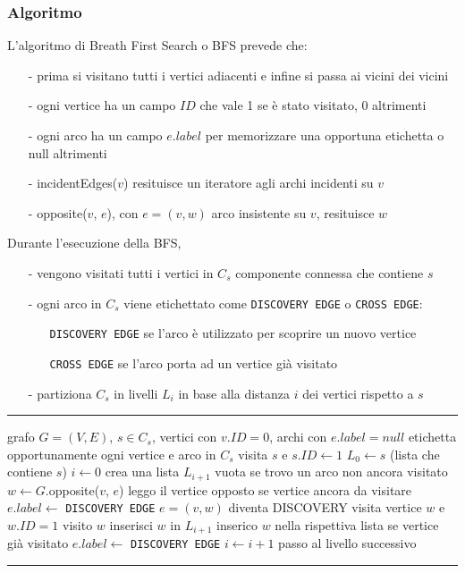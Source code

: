 \documentclass[a4paper]{article}
\makeatletter
\newenvironment{algo}[4]{
	\noindent\rule{\textwidth}{0.4pt}
	\begin{algorithmic}[1]
		\addtocounter{ALG@line}{-1}
		\Procedure{#1}{#2}
		\Require #3
		\Ensure #4
		\Statex }{
		\EndProcedure
	\end{algorithmic}
	\rule{\textwidth}{0.4pt}}
\makeatother
\begin{document}
\subsubsection*{Algoritmo}
L'algoritmo di Breath First Search o BFS prevede che:
\begin{itemize}[topsep=3pt, itemsep=0pt]
	\item[-] prima si visitano tutti i vertici adiacenti e infine si passa ai vicini dei vicini
	\item[-] ogni vertice ha un campo \(I\!D\) che vale 1 se è stato visitato, 0 altrimenti
	\item[-] ogni arco ha un campo \(e.label\) per memorizzare una opportuna etichetta o null altrimenti
	\item[-] incidentEdges(\(v\)) resituisce un iteratore agli archi incidenti su \(v\)
	\item[-] opposite(\(v\), \(e\)), con \(e = (v,w)\) arco insistente su \(v\), resituisce \(w\)
\end{itemize}
Durante l'esecuzione della BFS,
\begin{itemize}[topsep=3pt, itemsep=0pt]
	\item[-] vengono visitati tutti i vertici in \(C_s\) componente connessa che contiene \(s\)
	\item[-] ogni arco in \(C_s\) viene etichettato come \verb|DISCOVERY EDGE| o \verb|CROSS EDGE|:
	\begin{itemize}[topsep=0pt, itemsep=0pt]
		\item[] \verb|DISCOVERY EDGE| se l'arco è utilizzato per scoprire un nuovo vertice
		\item[] \verb|CROSS EDGE| se l'arco porta ad un vertice già visitato
	\end{itemize}
	\item[-] partiziona \(C_s\) in livelli \(L_i\) in base alla distanza \(i\) dei vertici rispetto a \(s\)
\end{itemize}

\begin{algo}{BFS}{$G$, $s$}{grafo $G = (V,E)$, $s \in C_s$, vertici con \(v.I\!D = 0\), archi con \(e.label = null\)}{etichetta opportunamente ogni vertice e arco in \(C_s\)}
	\State visita \(s\) e \(s.I\!D \gets 1\)
	\State \(L_0 \gets s\) (lista che contiene \(s\))
	\State \(i \gets 0\)
		\State crea una lista \(L_{i+1}\) vuota
				 \Comment se trovo un arco non ancora visitato
					\State \(w \gets G\).opposite(\(v\), \(e\)) \Comment leggo il vertice opposto
					 \Comment se vertice ancora da visitare
						\State \(e.label \gets\) \verb|DISCOVERY EDGE| \Comment \(e = (v,w)\) diventa DISCOVERY
						\State visita vertice \(w\) e \(w.I\!D = 1\) \Comment visito \(w\)
						\State inserisci \(w\) in \(L_{i+1}\) \Comment inserico \(w\) nella rispettiva lista
					\Else \Comment se vertice già visitato
						\State \(e.label \gets\) \verb|DISCOVERY EDGE|
					\EndIf
				\EndIf
			\EndFor
		\EndFor
		\State \(i \gets i+1\) \Comment passo al livello successivo
	\EndWhile
\end{algo}
\end{document}
